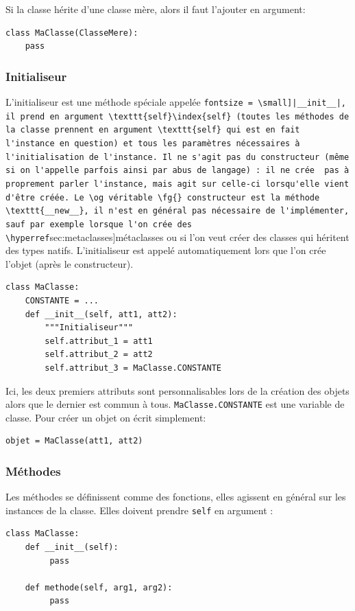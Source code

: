 \documentclass[a4paper, 10pt]{article}
\begin{document}
Si la classe hérite d'une classe mère, alors il faut l'ajouter en argument:
\begin{verbatim}
class MaClasse(ClasseMere):
    pass
\end{verbatim}

\subsubsection{Initialiseur}

L'initialiseur est une méthode spéciale appelée \Verb[fontsize = \small]|__init__|, il prend en argument \texttt{self}\index{self} (toutes les méthodes de la classe prennent en argument \texttt{self} qui est en fait l'instance en question) et tous les paramètres nécessaires à l'initialisation de l'instance. Il ne s'agit pas du constructeur (même si on l'appelle parfois ainsi par abus de langage) : il ne crée  pas à proprement parler l'instance, mais agit sur celle-ci lorsqu'elle vient d'être créée. Le \og véritable \fg{} constructeur est la méthode \texttt{__new__}, il n'est en général pas nécessaire de l'implémenter, sauf par exemple lorsque l'on crée des \hyperref[sec:metaclasses]{métaclasses} ou si l'on veut créer des classes qui héritent des types natifs. L'initialiseur est appelé automatiquement lors que l'on crée l'objet (après le constructeur).
\begin{verbatim}
class MaClasse:
    CONSTANTE = ...
    def __init__(self, att1, att2):
        """Initialiseur"""
        self.attribut_1 = att1
        self.attribut_2 = att2
        self.attribut_3 = MaClasse.CONSTANTE
\end{verbatim}
Ici, les deux premiers attributs sont personnalisables lors de la création des objets alors que le dernier est commun à tous. \texttt{MaClasse.CONSTANTE} est une variable de classe. Pour créer un objet on écrit simplement:
\begin{verbatim}
objet = MaClasse(att1, att2)
\end{verbatim}

\subsubsection{Méthodes}
Les méthodes se définissent comme des fonctions, elles agissent en général sur les instances de la classe. Elles doivent prendre \texttt{self} en argument :
\begin{verbatim}
class MaClasse:
    def __init__(self):
         pass

    def methode(self, arg1, arg2):
         pass
\end{verbatim}
\end{document}
